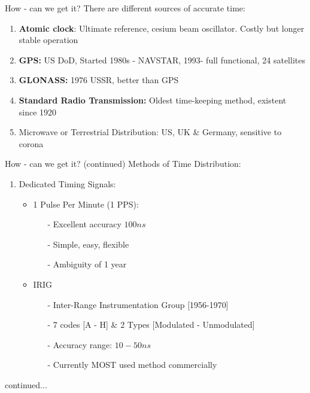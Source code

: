 \documentclass{beamer}
\begin{document}
   \begin{frame}{How - can we get it?}
   There are different sources of accurate time:
     \begin{enumerate}
     	\item \textbf{Atomic clock}: Ultimate reference, cesium beam oscillator. Costly but longer stable operation  
     	\item \textbf{GPS:} US DoD, Started 1980s - NAVSTAR, 1993- full functional, 24 satellites 
     	\item \textbf{GLONASS:} 1976 USSR, better than GPS
     	\item \textbf{Standard Radio Transmission:} Oldest time-keeping method, existent since 1920 
     	\item Microwave or Terrestrial Distribution: US, UK \& Germany, sensitive to corona
     \end{enumerate}
   \end{frame}

   \begin{frame}{How - can we get it? \tiny{(continued)}}
   	Methods of Time Distribution:
   	\begin{enumerate}
   		\item Dedicated Timing Signals:
   		\begin{itemize}
   			\item 1 Pulse Per Minute (1 PPS):
   			\begin{itemize}
   				\item[-] Excellent accuracy $100 ns$
   				\item[-] Simple, easy, flexible
   				\item[-] Ambiguity of 1 year
   			\end{itemize}
   			\item IRIG 
   			\begin{itemize}
   				\item[-]  Inter-Range Instrumentation Group [1956-1970]
   				\item[-] 7 codes [A - H] \& 2 Types [Modulated - Unmodulated]
   				\item[-] Accuracy range: $10-50 ns$ 
   				\item[-] Currently MOST used method commercially 
   			\end{itemize}
   		\end{itemize}
   	\end{enumerate}
   	\tiny continued...
   \end{frame}
\end{document}
